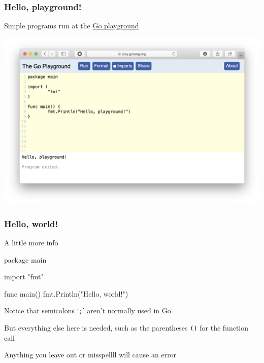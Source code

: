 \documentclass[handout,compress,t,11pt]{beamer}
\begin{document}
\begin{frame}[fragile]
\frametitle{Hello, playground!}
Simple programs run at the \href{https://play.golang.org}{Go playground}
    \vspace{-0.4\baselineskip}
\begin{center}
\includegraphics[height=0.9\textheight]{go-playground.png}
\end{center}
\end{frame}

\begin{frame}[fragile]
\frametitle{Hello, world!}
A little more info
\begin{golang}
package main

import "fmt"

func main() {
    fmt.Println("Hello, world!")
}
\end{golang}
    \vspace{0.5\baselineskip}
Notice that semicolons `\verb|;|' aren't normally used in Go \par
    \vspace{0.5\baselineskip}
But everything else here is needed, such as the parentheses \verb|()| for
the function call \par
    \vspace{0.5\baselineskip}
Anything you leave out or misspellll will cause an error
\end{frame}
\end{document}
